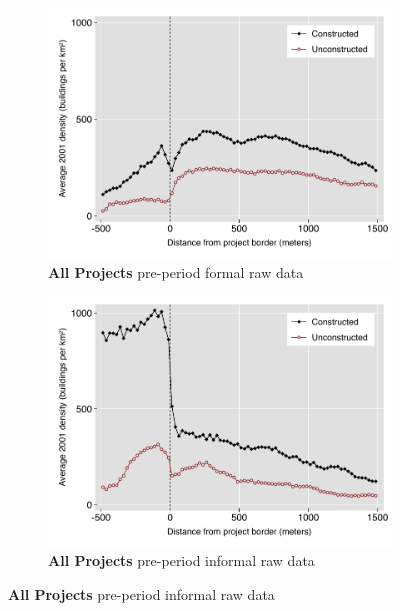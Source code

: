 \documentclass[12pt]{article}
\begin{document}
\begin{figure}
        \centering
        \begin{subfigure}[b]{0.48\textwidth}
                    \caption[Network2]%
            {{\footnotesize \textbf{All Projects} pre-period formal raw data}}    
            \label{fig:prefor}
            \centering
            \includegraphics[width=\textwidth,trim={0.3cm .3cm 0.1cm 0cm}, clip=true]{figures/bblu_for_pre_means_4_spk.pdf}

        \end{subfigure}
        \hfill
        \begin{subfigure}[b]{0.48\textwidth}  
                    \caption[]%
            {{\footnotesize \textbf{All Projects} pre-period informal  raw data}}      
            \label{fig:preinf}
            \centering 
            \includegraphics[width=\textwidth,trim={0.3cm .3cm 0.1cm 0cm}, clip=true]{figures/bblu_inf_pre_means_4_spk.pdf}


\end{subfigure}
\end{figure}
\end{document}
